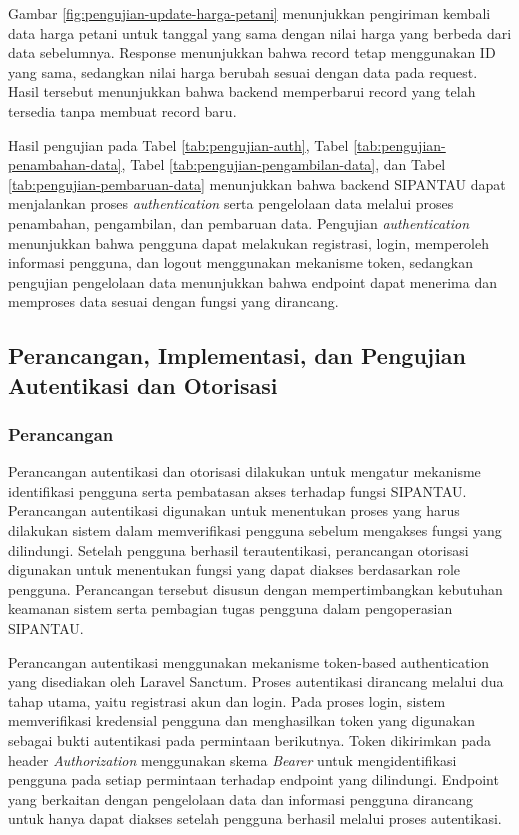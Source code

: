 Gambar \ref{fig:pengujian-update-harga-petani} menunjukkan pengiriman kembali data harga petani untuk tanggal yang sama dengan nilai harga yang berbeda dari data sebelumnya. Response menunjukkan bahwa record tetap menggunakan ID yang sama, sedangkan nilai harga berubah sesuai dengan data pada request. Hasil tersebut menunjukkan bahwa backend memperbarui record yang telah tersedia tanpa membuat record baru.

Hasil pengujian pada Tabel \ref{tab:pengujian-auth}, Tabel \ref{tab:pengujian-penambahan-data}, Tabel \ref{tab:pengujian-pengambilan-data}, dan Tabel \ref{tab:pengujian-pembaruan-data} menunjukkan bahwa backend SIPANTAU dapat menjalankan proses \textit{authentication} serta pengelolaan data melalui proses penambahan, pengambilan, dan pembaruan data. Pengujian \textit{authentication} menunjukkan bahwa pengguna dapat melakukan registrasi, login, memperoleh informasi pengguna, dan logout menggunakan mekanisme token, sedangkan pengujian pengelolaan data menunjukkan bahwa endpoint dapat menerima dan memproses data sesuai dengan fungsi yang dirancang.

\subsection{Perancangan, Implementasi, dan Pengujian Autentikasi dan Otorisasi}

\subsubsection{Perancangan}

Perancangan autentikasi dan otorisasi dilakukan untuk mengatur mekanisme identifikasi pengguna serta pembatasan akses terhadap fungsi SIPANTAU. Perancangan autentikasi digunakan untuk menentukan proses yang harus dilakukan sistem dalam memverifikasi pengguna sebelum mengakses fungsi yang dilindungi. Setelah pengguna berhasil terautentikasi, perancangan otorisasi digunakan untuk menentukan fungsi yang dapat diakses berdasarkan role pengguna. Perancangan tersebut disusun dengan mempertimbangkan kebutuhan keamanan sistem serta pembagian tugas pengguna dalam pengoperasian SIPANTAU.

Perancangan autentikasi menggunakan mekanisme token-based authentication yang disediakan oleh Laravel Sanctum. Proses autentikasi dirancang melalui dua tahap utama, yaitu registrasi akun dan login. Pada proses login, sistem memverifikasi kredensial pengguna dan menghasilkan token yang digunakan sebagai bukti autentikasi pada permintaan berikutnya. Token dikirimkan pada header \textit{Authorization} menggunakan skema \textit{Bearer} untuk mengidentifikasi pengguna pada setiap permintaan terhadap endpoint yang dilindungi. Endpoint yang berkaitan dengan pengelolaan data dan informasi pengguna dirancang untuk hanya dapat diakses setelah pengguna berhasil melalui proses autentikasi.

